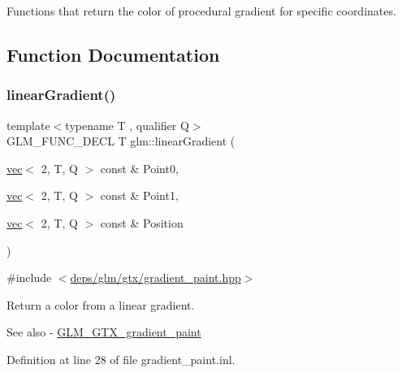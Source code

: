 Functions that return the color of procedural gradient for specific coordinates. 

\subsection{Function Documentation}
\mbox{\label{group__gtx__gradient__paint_ga849241df1e55129b8ce9476200307419}} 
\subsubsection{\texorpdfstring{linear\+Gradient()}{linearGradient()}}
{\footnotesize\ttfamily template$<$typename T , qualifier Q$>$ \\
G\+L\+M\+\_\+\+F\+U\+N\+C\+\_\+\+D\+E\+CL T glm\+::linear\+Gradient (\begin{DoxyParamCaption}\item[{\hyperlink{structglm_1_1vec}{vec}$<$ 2, T, Q $>$ const \&}]{Point0,  }\item[{\hyperlink{structglm_1_1vec}{vec}$<$ 2, T, Q $>$ const \&}]{Point1,  }\item[{\hyperlink{structglm_1_1vec}{vec}$<$ 2, T, Q $>$ const \&}]{Position }\end{DoxyParamCaption})}



{\ttfamily \#include $<$\hyperlink{gradient__paint_8hpp}{deps/glm/gtx/gradient\+\_\+paint.\+hpp}$>$}

Return a color from a linear gradient. \begin{DoxySeeAlso}{See also}
-\/ \hyperlink{group__gtx__gradient__paint}{G\+L\+M\+\_\+\+G\+T\+X\+\_\+gradient\+\_\+paint} 
\end{DoxySeeAlso}


Definition at line 28 of file gradient\+\_\+paint.\+inl.

\mbox{\label{group__gtx__gradient__paint_gaaecb1e93de4cbe0758b882812d4da294}} 
